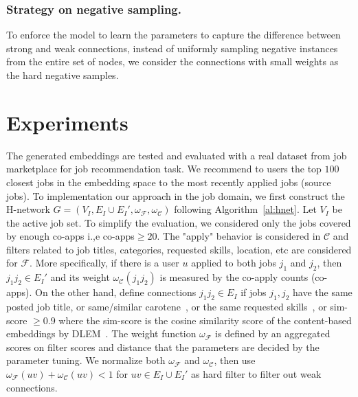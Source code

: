 \documentclass[manuscript,screen,review]{acmart}
\newcommand\Fcal{\mathcal{F}}
\newcommand{\Ccal}{\mathcal{C}}
\begin{document}
\subsubsection{Strategy on negative sampling.} 
To enforce the model to learn the parameters to capture the difference between strong and weak connections, instead of uniformly sampling negative instances from the entire set of nodes, we consider the connections with small weights as the hard negative samples. 

\section{Experiments} \label{Experiments}
The generated embeddings are tested and evaluated with a real dataset from job marketplace
for job recommendation task. We recommend to users the top $100$ closest jobs in the embedding space to the most recently applied jobs (source jobs). To implementation our approach in the job domain, we first construct the H-network $G=(V_I,E_I\cup E_I',\omega_{\mathcal{F}},\omega_{\mathcal{C}})$ following Algorithm~\ref{al:hnet}. Let $V_I$ be the active job set. To simplify the evaluation, we considered only the jobs covered by enough co-apps i.,e co-apps$\geq20$.  The "apply" behavior is considered in  $\Ccal$ and filters related to job titles, categories, requested skills, location, etc are considered for $\Fcal$. More specifically, if there is a user $u$ applied to both jobs $j_1$ and $j_2$, then $j_1j_2\in E_I'$ and its weight $\omega_{\Ccal}(j_1j_2)$ is measured by the co-apply counts (co-apps). On the other hand, define connections $j_1j_2\in E_I$ if jobs $j_1,j_2$ have the same posted job title, or same/similar carotene~\cite{wang2019deepcarotene}, or the same requested skills~\cite{javed2017large}, or sim-score $\geq0.9$ where the sim-score is the cosine similarity score of the content-based embeddings by DLEM~\cite{zhao:2021embedding}. The weight function $\omega_{\Fcal}$ is defined by an aggregated scores on filter scores and distance that the parameters are decided by the parameter tuning.  We normalize both $\omega_{\Fcal}$ and $\omega_{\Ccal}$, then use $\omega_{\Fcal}(uv)+\omega_{\Ccal}(uv)<1$ for $uv\in E_I\cup E_I'$ as hard filter to filter out weak connections.
\end{document}
